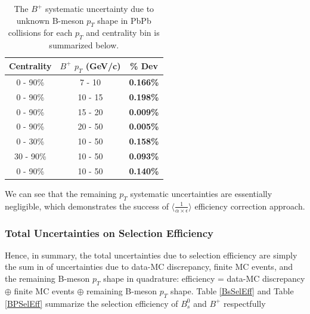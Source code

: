 \begin{table}[h]
\begin{center}
\caption{The $B^+$ systematic uncertainty due to unknown B-meson $p_T$ shape in PbPb collisions for each $p_T$ and centrality bin is summarized below.}
\vspace{1em}
\label{BPPTShape}
  \begin{tabular}{| c | c |c |}
    \hline
     Centrality & $B^+$ $p_T$ (GeV/c) & \% Dev \\
    \hline
    \hline
0 - 90\% & 7 - 10 &   \textbf{0.166\% }     \\ 
0 - 90\% & 10 - 15 & \textbf{0.198\% }    \\ 
0 - 90\% & 15 - 20 &  \textbf{0.009\% }     \\ 
0 - 90\% & 20 - 50 &  \textbf{0.005\% }    \\ 
0 - 30\% & 10 - 50 &   \textbf{0.158\% }  \\ 
30 - 90\% & 10 - 50 & \textbf{0.093\% }    \\ 
0 - 90\% & 10 - 50 &  \textbf{0.140\% }   \\ 
    \hline
    \hline
\end{tabular}
\end{center}
\end{table}

We can see that the remaining $p_T$ systematic uncertainties are essentially negligible, which demonstrates the success of $\langle\frac{1}{\alpha \times \epsilon}\rangle$ efficiency correction approach. 

\subsubsection{Total Uncertainties on Selection Efficiency}

Hence, in summary, the total uncertainties due to selection efficiency are simply the sum in of uncertainties due to data-MC discrepancy, finite MC events, and the remaining B-meson $p_T$ shape in quadrature: efficiency = data-MC discrepancy $\oplus$ finite MC events $\oplus$ remaining B-meson $p_T$ shape. Table \ref{BsSelEff} and Table \ref{BPSelEff} summarize the selection efficiency of $B^0_s$ and $B^+$ respectfully 


